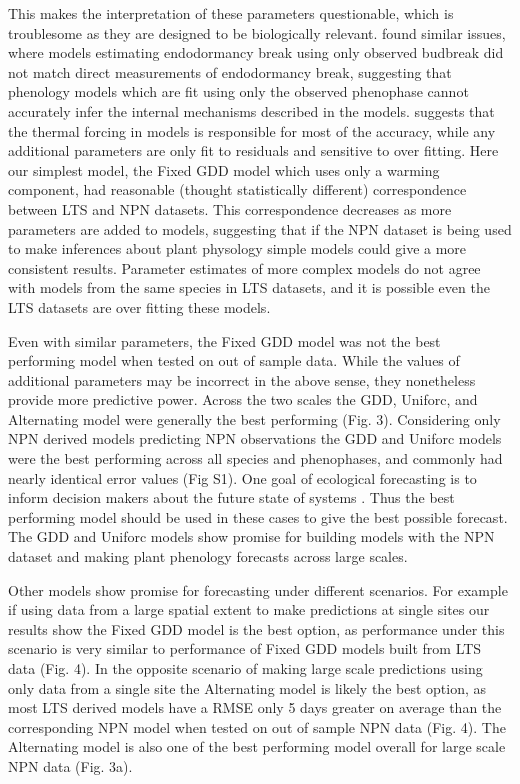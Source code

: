\documentclass[fleqn,10pt,lineno]{wlpeerj} %
\begin{document}
This makes the interpretation of these parameters questionable, which is troublesome as they are designed to be biologically relevant. \cite{chuine2016} found similar issues, where models estimating endodormancy break using only observed budbreak did not match direct measurements of endodormancy break, suggesting that phenology models which are fit using only the observed phenophase cannot accurately infer the internal mechanisms described in the models. \cite{basler2016} suggests that the thermal forcing in models is responsible for most of the accuracy, while any additional parameters are only fit to residuals and sensitive to over fitting. Here our simplest model, the Fixed GDD model which uses only a warming component, had reasonable (thought statistically different) correspondence between LTS and NPN datasets. This correspondence decreases as more parameters are added to models, suggesting that if the NPN dataset is being used to make inferences about plant physology simple models could give a more consistent results. Parameter estimates of more complex models do not agree with models from the same species in LTS datasets, and it is possible even the LTS datasets are over fitting these models. 

Even with similar parameters, the Fixed GDD model was not the best performing model when tested on out of sample data. While the values of additional parameters may be incorrect in the above sense, they nonetheless provide more predictive power. Across the two scales the GDD, Uniforc, and Alternating model were generally the best performing (Fig. 3). Considering only NPN derived models predicting NPN observations the GDD and Uniforc models were the best performing across all species and phenophases, and commonly had nearly identical error values (Fig S1). One goal of ecological forecasting is to inform decision makers about the future state of systems \citep{dietz2018}. Thus the best performing model should be used in these cases to give the best possible forecast. The GDD and Uniforc models show promise for building models with the NPN dataset and making plant phenology forecasts across large scales.

Other models show promise for forecasting under different scenarios. For example if using data from a large spatial extent to make predictions at single sites our results show the Fixed GDD model is the best option, as performance under this scenario is very similar to performance of Fixed GDD models built from LTS data (Fig. 4). In the opposite scenario of making large scale predictions using only data from a single site the Alternating model is likely the best option, as most LTS derived models have a RMSE only 5 days greater on average than the corresponding NPN model when tested on out of sample NPN data (Fig. 4). The Alternating model is also one of the best performing model overall for large scale NPN data (Fig. 3a). 
\end{document}
